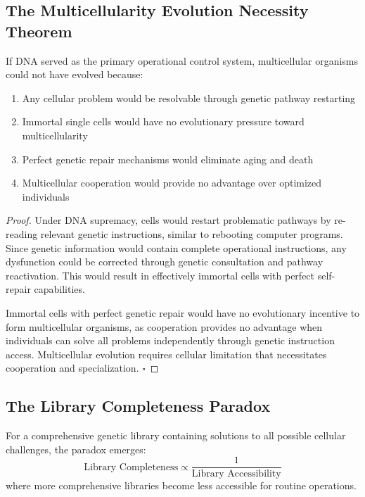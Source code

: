 ﻿\documentclass[11pt,a4paper]{article}
\begin{document}
\subsection{The Multicellularity Evolution Necessity Theorem}

\begin{theorem}
If DNA served as the primary operational control system, multicellular organisms could not have evolved because:
\begin{enumerate}
\item Any cellular problem would be resolvable through genetic pathway restarting
\item Immortal single cells would have no evolutionary pressure toward multicellularity  
\item Perfect genetic repair mechanisms would eliminate aging and death
\item Multicellular cooperation would provide no advantage over optimized individuals
\end{enumerate}
\end{theorem}

\begin{proof}
Under DNA supremacy, cells would restart problematic pathways by re-reading relevant genetic instructions, similar to rebooting computer programs. Since genetic information would contain complete operational instructions, any dysfunction could be corrected through genetic consultation and pathway reactivation. This would result in effectively immortal cells with perfect self-repair capabilities.

Immortal cells with perfect genetic repair would have no evolutionary incentive to form multicellular organisms, as cooperation provides no advantage when individuals can solve all problems independently through genetic instruction access. Multicellular evolution requires cellular limitation that necessitates cooperation and specialization. $\square$
\end{proof}

\subsection{The Library Completeness Paradox}

\begin{definition}
For a comprehensive genetic library containing solutions to all possible cellular challenges, the paradox emerges:
\begin{equation}
\text{Library Completeness} \propto \frac{1}{\text{Library Accessibility}}
\end{equation}
where more comprehensive libraries become less accessible for routine operations.
\end{definition}
\end{document}
